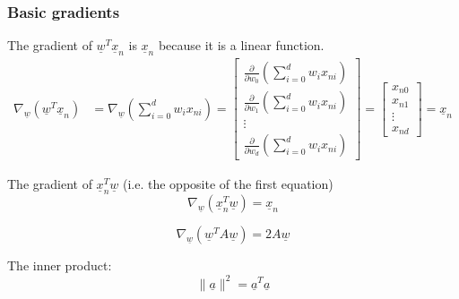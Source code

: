     \subsubsection{Basic gradients}
    \begin{definition}
        The gradient of $\underline{w}^T \underline{x}_n$ is $\underline{x}_n$ because it is a linear function.
        \begin{align}
            \nabla_{\underline{w}} \left( \underline{w}^T \underline{x}_n \right) &= \nabla_{\underline{w}} \left( \sum_{i=0}^{d} w_i x_{ni} \right) 
            = 
            \begin{bmatrix}
                \frac{\partial}{\partial w_0} \left( \sum_{i=0}^{d} w_i x_{ni} \right) \\
                \frac{\partial}{\partial w_1} \left( \sum_{i=0}^{d} w_i x_{ni} \right) \\
                \vdots \\
                \frac{\partial}{\partial w_d} \left( \sum_{i=0}^{d} w_i x_{ni} \right)
            \end{bmatrix}
            =
            \begin{bmatrix}
                x_{n0} \\
                x_{n1} \\
                \vdots \\
                x_{nd}
            \end{bmatrix}
            = \underline{x}_n
        \end{align}

        The gradient of $\underline{x}_n^T \underline{w}$ (i.e. the opposite of the first equation)
        \begin{equation}
            \nabla_{\underline{w}} \left( \underline{x}_n^T \underline{w} \right) = \underline{x}_n    
        \end{equation}
        
        \begin{equation}
            \nabla_{\underline{w}} \left( \underline{w}^T A \underline{w} \right) = 2A \underline{w}
        \end{equation}

        The inner product:
        \begin{equation}
            \|\underline{a}\|^2 = \underline{a}^T \underline{a}
        \end{equation}
    \end{definition}

